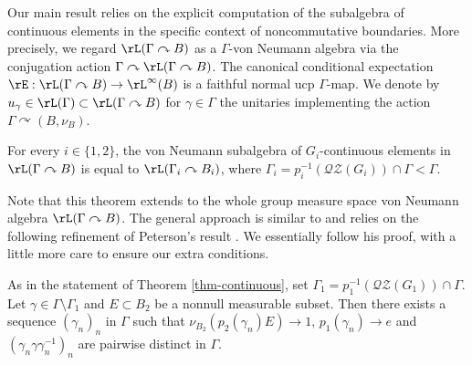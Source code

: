 Our main result relies on the explicit computation of the subalgebra of continuous elements in the specific context of noncommutative boundaries. More precisely, we regard $\rL(\Gamma \curvearrowright B)$ as a $\Gamma$-von Neumann algebra via the conjugation action $\Gamma \curvearrowright \rL(\Gamma \curvearrowright B)$. The canonical conditional expectation $\rE : \rL(\Gamma \curvearrowright B) \to \rL^\infty(B)$ is a faithful normal ucp $\Gamma$-map. We denote by $u_\gamma \in \rL(\Gamma) \subset \rL(\Gamma \curvearrowright B)$ for $\gamma \in \Gamma$ the unitaries implementing the action $\Gamma \curvearrowright (B, \nu_B)$.

\begin{thm}\label{thm-continuous}
For every $i \in \{1, 2\}$, the von Neumann subalgebra of $G_i$-continuous elements in $\rL(\Gamma \curvearrowright B)$ is equal to $\rL(\Gamma_i \curvearrowright B_i)$, where $\Gamma_i = p_i^{-1}(\mathscr{Q}\mathscr{Z}(G_i)) \cap \Gamma < \Gamma$.
\end{thm}

Note that this theorem extends \cite[Lem.\,5.4]{BBHP20} to the whole group measure space von Neumann algebra $\rL(\Gamma \curvearrowright B)$. The general approach is similar to \cite[Lem.\,5.4]{BBHP20} and relies on the following refinement of Peterson's result \cite[Lem.\,5.1]{Pe14}. We essentially follow his proof, with a little more care to ensure our extra conditions.

\begin{lem}\label{lem-sequence}
As in the statement of Theorem \ref{thm-continuous}, set $\Gamma_1 = p_1^{-1}(\mathscr{Q}\mathscr{Z}(G_1)) \cap \Gamma$.
Let $\gamma \in \Gamma \setminus \Gamma_1$ and $E \subset B_2$ be a nonnull measurable subset. Then there exists a sequence $(\gamma_n)_{n}$ in $\Gamma$ such that $\nu_{B_2}(p_2(\gamma_n) E) \to 1$, $p_1(\gamma_n) \to e$ and $(\gamma_n \gamma \gamma_n^{-1})_{n}$ are pairwise distinct in $\Gamma$.
\end{lem}

